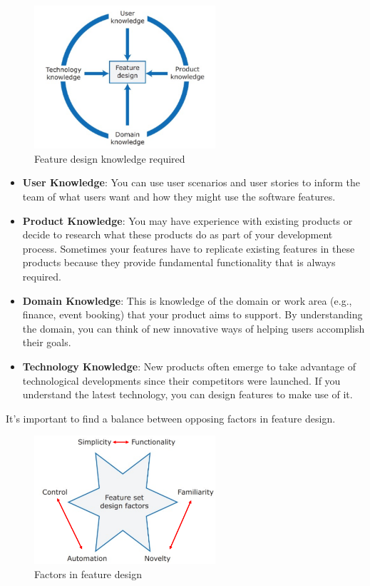 \begin{figure} [H]
    \centering
    \includegraphics[width=0.6\textwidth]{images/Stories/feature_design.png}
    \caption{Feature design knowledge required}
    \label{fig:featuredesign}
\end{figure} 

\begin{itemize}
    \item \textbf{User Knowledge}: You can use user scenarios and user stories to inform the team of what users want and how they might use the software features.
    \item \textbf{Product Knowledge}: You may have experience with existing products or decide to research what these products do as part of your development process. Sometimes your features have to replicate existing features in these products because they provide fundamental functionality that is always required.
    \item \textbf{Domain Knowledge}: This is knowledge of the domain or work area (e.g., finance, event booking) that your product aims to support. By understanding the domain, you can think of new innovative ways of helping users accomplish their goals.
    \item \textbf{Technology Knowledge}: New products often emerge to take advantage of technological developments since their competitors were launched. If you understand the latest technology, you can design features to make use of it.
\end{itemize}

\newpage
It's important to find a balance between opposing factors in feature design.

\begin{figure} [H]
    \centering
    \includegraphics[width=0.6\textwidth]{images/Stories/factors_design.png}
    \caption{Factors in feature design}
    \label{fig:factorsdesign}
\end{figure}

